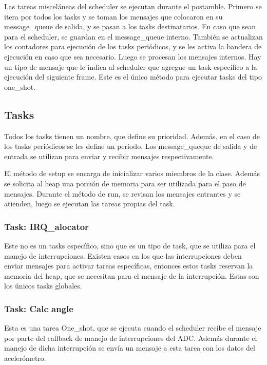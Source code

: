 Las tareas misceláneas del scheduler se ejecutan durante el postamble. Primero se itera por todos
los tasks y se toman los mensajes que colocaron en su message\_queue de salida, y se pasan a los
tasks destinatarios. En caso que sean para el scheduler, se guardan en el message\_queue
interno. También se actualizan los contadores para ejecución de los tasks periódicos, y se les
activa la bandera de ejecución en caso que sea necesario. Luego se procesan los mensajes internos.
Hay un tipo de mensaje que le indica al scheduler que agregue un task específico a la ejecución del
siguiente frame. Este es el único método para ejecutar tasks del tipo one\_shot.


\subsection{Tasks}
\label{sec:tasks}

Todos los tasks tienen un nombre, que define su prioridad. Además, en el caso de los tasks
periódicos se les define un periodo. Los message\_queque de salida y de entrada se utilizan para
enviar y recibir mensajes respectivamente.

El método de setup se encarga de inicializar varios miembros de la clase. Además se solicita al heap
una porción de memoria para ser utilizada para el paso de mensajes. Durante el método de run, se
revisan los mensajes entrantes y se atienden, luego se ejecutan las tareas propias del task.

\subsubsection{Task: IRQ\_alocator}
\label{sec:IRQ_allocator}

Este no es un tasks específico, sino que es un tipo de task, que se utiliza para el manejo de
interrupciones. Existen casos en los que las interrupciones deben enviar mensajes para activar
tareas específicas, entonces estos tasks reservan la memoria del heap, que se necesitan para el
mensaje de la interrupción. Estas son los únicos tasks globales. 

\subsubsection{Task: Calc angle}
\label{sec:calc_angle}
Esta es una tarea One\_shot, que se ejecuta cuando el scheduler recibe el mensaje por parte del
callback de manejo de interrupciones del ADC. Además durante el manejo de dicha interrupción se
envía un mensaje a esta tarea con los datos del acelerómetro.

